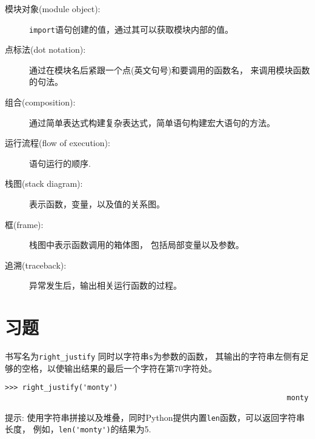 \documentclass[10pt]{book}
\begin{document}
\begin{description}
\item[模块对象(module object):]  {\tt import}语句创建的值，通过其可以获取模块内部的值。

\item[点标法(dot notation):]  通过在模块名后紧跟一个点(英文句号)和要调用的函数名，
来调用模块函数的句法。

\item[组合(composition):] 通过简单表达式构建复杂表达式，简单语句构建宏大语句的方法。

\item[运行流程(flow of execution):] 语句运行的顺序.

\item[栈图(stack diagram):]  表示函数，变量，以及值的关系图。

\item[框(frame):]  栈图中表示函数调用的箱体图， 包括局部变量以及参数。

\item[追溯(traceback):] 异常发生后，输出相关运行函数的过程。


\end{description}


\section{习题}

\begin{exercise}

书写名为\verb"right_justify" 同时以字符串{\tt s}为参数的函数，
其输出的字符串左侧有足够的空格，以使输出结果的最后一个字符在第70字符处。

\begin{verbatim}
>>> right_justify('monty')
                                                                 monty
\end{verbatim}

提示: 使用字符串拼接以及堆叠，同时Python提供内置{\tt len}函数，可以返回字符串长度，
例如，\verb"len('monty')"的结果为5.

\end{exercise}
\end{document}
